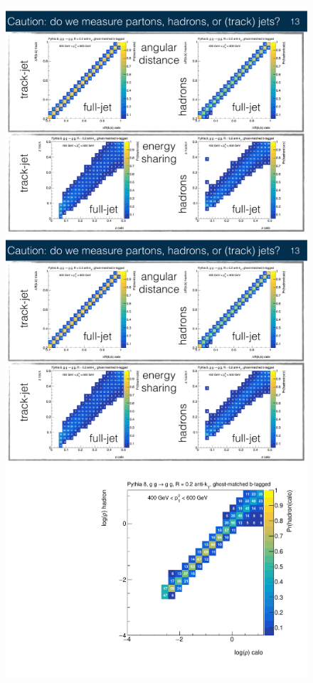 \begin{figure}[htpb!]
\begin{center}
\includegraphics[width=0.95\linewidth]{figures/gbb/truth_level/compare2.pdf}\\
\includegraphics[width=0.95\linewidth]{figures/gbb/truth_level/compare1.pdf}
\includegraphics[width=0.45\linewidth]{figures/gbb/truth_level/rho_calo_track_b.pdf}

\end{center}
\end{figure}
